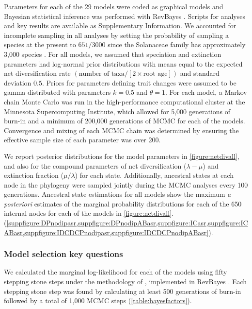 Parameters for each of the 29 models were coded as graphical models and Bayesian statistical inference was performed with RevBayes \citep{hoehna_2016}.
Scripts for analyses and key results are available as Supplementary Information. 
We accounted for incomplete sampling in all analyses by setting the probability of sampling a species at the present to $651/3000$ \citep[using the method of][]{fitzjohn_2009} since the Solanaceae family has approximately 3,000 species \citep{solsource}.
For all models, we assumed that speciation and extinction parameters had log-normal prior distributions with means equal to the expected net diversification rate $(\text{number of taxa} / [2 \times \text{root age}])$ and standard deviation $0.5$.
Priors for parameters defining trait changes were assumed to be gamma distributed with parameters $k=0.5$ and $\theta=1$. 
For each model, a Markov chain Monte Carlo \citep[MCMC;][]{metropolis1953equation,Hastings1970} was run in the high-performance computational cluster at the Minnesota Supercomputing Institute, which allowed for 5,000 generations of burn-in and a minimum of 200,000 generations of MCMC for each of the models.
Convergence and mixing of each MCMC chain was determined by ensuring the effective sample size of each parameter was over 200.

We report posterior distributions for the model parameters in \cref{figure:netdivall}, and also for the compound parameters of net diversification ($\lambda - \mu$) and extinction fraction ($\mu / \lambda$) for each state.
Additionally, ancestral states at each node in the phylogeny were sampled jointly during the MCMC analyses every 100 generations. 
Ancestral state estimations for all models show the maximum \emph{a posteriori} estimates of the marginal probability distributions for each of the 650 internal nodes for each of the models in \cref{figure:netdivall}. (\cref{suppfigure:DPnodipasr,suppfigure:DPnodipABasr,suppfigure:ICasr,suppfigure:ICABasr,suppfigure:IDCDCPnodipasr,suppfigure:IDCDCPnodipABasr}).

\subsubsection{Model selection key questions}

We calculated the marginal log-likelihood for each of the models using fifty stepping stone steps under the methodology of \citet{xie_2010}, implemented in RevBayes \citep{hoehna_2016}.
Each stepping stone step was found by calculating at least 500 generations of burn-in followed by a total of 1,000 MCMC steps (\cref{table:bayesfactors}).

